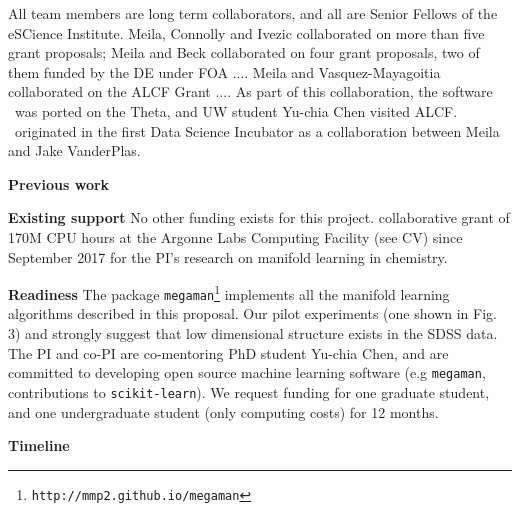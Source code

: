 \documentclass[floatfix,11pt]{article}
\begin{document}
All team members are long term collaborators, and all are Senior Fellows of the eSCience Institute. Meila, Connolly and Ivezic collaborated on more than five grant proposals; Meila and Beck collaborated on four grant proposals, two of them funded by the DE under FOA .... Meila and Vasquez-Mayagoitia collaborated on the ALCF Grant .... As part of this collaboration, the software \mmani~was ported on the Theta, and UW student Yu-chia Chen visited ALCF. \mmani~originated in the first Data Science Incubator as a collaboration between Meila and Jake VanderPlas. 





{\bf Previous work}

{\bf Existing support} No other funding exists for this project. collaborative grant of 170M CPU hours at the Argonne Labs Computing Facility (see CV) since September 2017 for the PI's research on manifold learning in chemistry.

{\bf Readiness} The package {\tt megaman}\footnote{{\tt http://mmp2.github.io/megaman}} \cite{mcqueenMVdpZ:megaman16,*mcqueenMVdpZ:megaman-jmlr16} implements all the manifold learning algorithms described in this proposal. Our pilot experiments (one shown in Fig. 3) and \cite{Yip04} strongly suggest that low dimensional structure exists in the SDSS data. The PI and co-PI are co-mentoring PhD student Yu-chia Chen, and are committed to developing open source machine learning software (e.g {\tt megaman}, contributions to {\tt scikit-learn}). We request funding for one graduate student, and one undergraduate student (only computing costs) for 12 months.


{\bf Timeline} 

\vspace{-2.1em}



\vspace{0.6em}


\vspace{0.6em}
\end{document}
